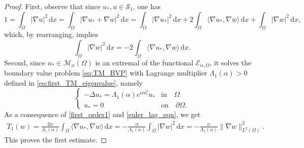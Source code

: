 \documentclass[10pt,a4paper]{amsart}
\newcommand{\ud}{\,\mathrm{d}}
\begin{document}
\begin{proof}
\noindent First, observe
that since $u_*,u\in \mathcal{S}_1$, one has
\[1 = \int_\Omega |\nabla u|^2 \ud x = \int_\Omega |\nabla u_* + \nabla w|^2 \ud x =
\int_\Omega |\nabla u_*|^2 \ud x + 2 \int_\Omega \langle \nabla u_*, \nabla w \rangle
\ud x + \int_\Omega |\nabla w|^2 \ud x,\]
which, by rearranging, implies  
\begin{equation} \label{first_order1}  
\int_\Omega |\nabla w|^2 \ud x = -2 \int_\Omega \langle \nabla u_*, \nabla w
\rangle \ud x.
\end{equation} 
Second, since $u_*\in\mathcal{M}_\alpha(\Omega)$ is an extremal of the functional $\mathscr{E}_{\alpha,\Omega}$, it solves the 
boundary value problem \eqref{eq:TM_BVP} with Lagrange multiplier $\Lambda_1(\alpha)>0$ defined in \eqref{eq:first_TM_eigenvalue}, namely 
\begin{equation}\label{euler_lag_eqn}
		 \begin{cases}
			-\Delta u_*  = \Lambda_1(\alpha)  e^{\alpha u_{*}^2} u_* & \mbox{in} \quad \Omega\\
			u_*=0 & \mbox{on} \quad\partial \Omega.
		\end{cases} 
	\end{equation}
As a consequence of \eqref{first_order1} and 
\eqref{euler_lag_eqn}, we get
\begin{eqnarray} \label{first_order2} 
T_1(w) =  \frac{2\alpha}{\Lambda_1(\alpha)} \int_\Omega \langle \nabla u_*, \nabla w \rangle \ud x = -\frac{\alpha}{\Lambda_1(\alpha)} \int_\Omega |\nabla w|^2\ud x = -\frac{\alpha}{\Lambda_1(\alpha)} 
\| \nabla w \|_{L^2(\Omega)}^2. 
\end{eqnarray} 
This proves the first estimate.


\end{proof}
\end{document}
